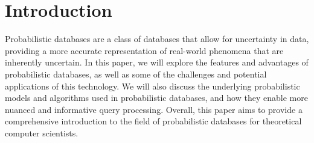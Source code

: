 \chapter{Introduction}

Probabilistic databases are a class of databases that allow for uncertainty in data, providing a more accurate representation of real-world phenomena that are inherently uncertain. In this paper, we will explore the features and advantages of probabilistic databases, as well as some of the challenges and potential applications of this technology. We will also discuss the underlying probabilistic models and algorithms used in probabilistic databases, and how they enable more nuanced and informative query processing. Overall, this paper aims to provide a comprehensive introduction to the field of probabilistic databases for theoretical computer scientists.